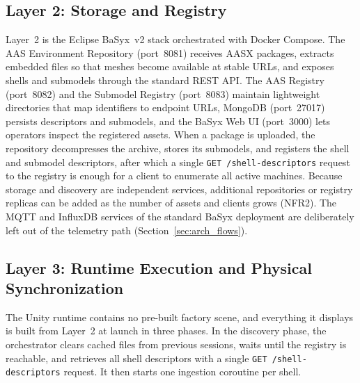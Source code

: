 \documentclass{ieeeojies}
\begin{document}
\subsection{Layer 2: Storage and Registry}
\label{sec:impl_basyx}

Layer~2 is the Eclipse BaSyx~v2 stack orchestrated with Docker Compose. The AAS Environment Repository (port~8081) receives AASX packages, extracts embedded files so that meshes become available at stable URLs, and exposes shells and submodels through the standard REST API. The AAS Registry (port~8082) and the Submodel Registry (port~8083) maintain lightweight directories that map identifiers to endpoint URLs, MongoDB (port~27017) persists descriptors and submodels, and the BaSyx Web UI (port~3000) lets operators inspect the registered assets. When a package is uploaded, the repository decompresses the archive, stores its submodels, and registers the shell and submodel descriptors, after which a single \texttt{GET /shell-descriptors} request to the registry is enough for a client to enumerate all active machines. Because storage and discovery are independent services, additional repositories or registry replicas can be added as the number of assets and clients grows (NFR2). The MQTT and InfluxDB services of the standard BaSyx deployment are deliberately left out of the telemetry path (Section~\ref{sec:arch_flows}).

\subsection{Layer 3: Runtime Execution and Physical Synchronization}
\label{sec:impl_unity}

The Unity runtime contains no pre-built factory scene, and everything it displays is built from Layer~2 at launch in three phases. In the discovery phase, the orchestrator clears cached files from previous sessions, waits until the registry is reachable, and retrieves all shell descriptors with a single \texttt{GET /shell-descriptors} request. It then starts one ingestion coroutine per shell.
\end{document}

